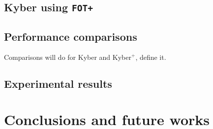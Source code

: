 \documentclass[floatrow,journal=tches,submission]{iacrtrans}
\newcommand{\monospace}{\texttt}
\newcommand{\fotplus}{\monospace{FOT+}}
\begin{document}
\subsection{Kyber using \fotplus}
\subsection{Performance comparisons}\label{sec:exp-results}
% 
Comparisons will do for Kyber and Kyber$^+$, define it. 

\subsection{Experimental results}


\section{Conclusions and future works}\label{sec:future-works}



\end{document}
